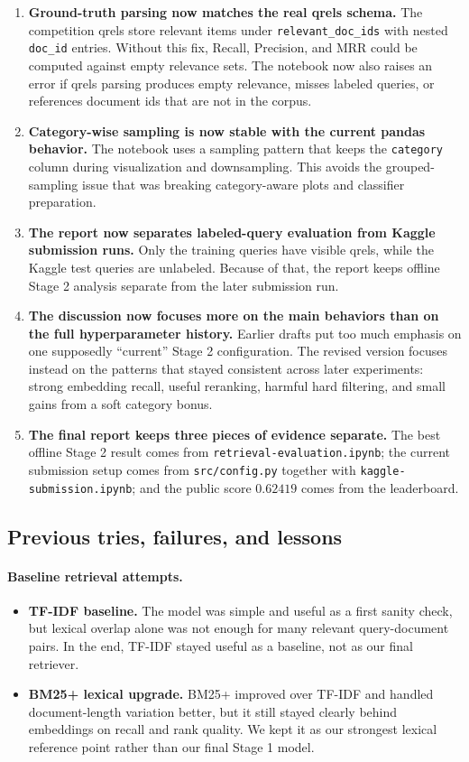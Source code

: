 \documentclass[11pt,a4paper]{article}
\begin{document}
\begin{enumerate}
    \item \textbf{Ground-truth parsing now matches the real qrels schema.} The competition qrels store relevant items under \texttt{relevant\_doc\_ids} with nested \texttt{doc\_id} entries. Without this fix, Recall, Precision, and MRR could be computed against empty relevance sets. The notebook now also raises an error if qrels parsing produces empty relevance, misses labeled queries, or references document ids that are not in the corpus.
    \item \textbf{Category-wise sampling is now stable with the current pandas behavior.} The notebook uses a sampling pattern that keeps the \texttt{category} column during visualization and downsampling. This avoids the grouped-sampling issue that was breaking category-aware plots and classifier preparation.
    \item \textbf{The report now separates labeled-query evaluation from Kaggle submission runs.} Only the training queries have visible qrels, while the Kaggle test queries are unlabeled. Because of that, the report keeps offline Stage 2 analysis separate from the later submission run.
    \item \textbf{The discussion now focuses more on the main behaviors than on the full hyperparameter history.} Earlier drafts put too much emphasis on one supposedly ``current'' Stage 2 configuration. The revised version focuses instead on the patterns that stayed consistent across later experiments: strong embedding recall, useful reranking, harmful hard filtering, and small gains from a soft category bonus.
    \item \textbf{The final report keeps three pieces of evidence separate.} The best offline Stage 2 result comes from \texttt{retrieval-evaluation.ipynb}; the current submission setup comes from \texttt{src/config.py} together with \texttt{kaggle-submission.ipynb}; and the public score \(0.62419\) comes from the leaderboard.
\end{enumerate}

\subsection{Previous tries, failures, and lessons}

\paragraph{Baseline retrieval attempts.}
\begin{itemize}
    \item \textbf{TF-IDF baseline.} The model was simple and useful as a first sanity check, but lexical overlap alone was not enough for many relevant query-document pairs. In the end, TF-IDF stayed useful as a baseline, not as our final retriever.
    \item \textbf{BM25+ lexical upgrade.} BM25+ improved over TF-IDF and handled document-length variation better, but it still stayed clearly behind embeddings on recall and rank quality. We kept it as our strongest lexical reference point rather than our final Stage 1 model.
\end{itemize}
\end{document}
